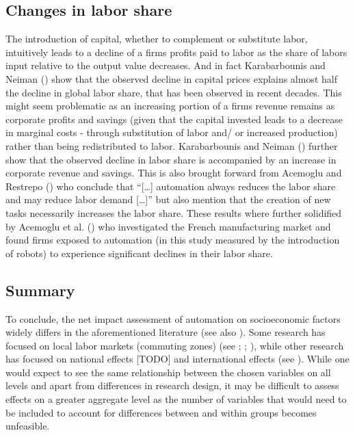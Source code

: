 \documentclass[
  12pt,
  a4paperpaper,
]{article}
\begin{document}
\subsection{Changes in labor share}\label{changes-in-labor-share}

The introduction of capital, whether to complement or substitute labor,
intuitively leads to a decline of a firms profits paid to labor as the
share of labors input relative to the output value decreases. And in
fact Karabarbounis and Neiman
() show that the
observed decline in capital prices explains almost half the decline in
global labor share, that has been observed in recent decades. This might
seem problematic as an increasing portion of a firms revenue remains as
corporate profits and savings (given that the capital invested leads to
a decrease in marginal costs - through substitution of labor and/ or
increased production) rather than being redistributed to labor.
Karabarbounis and Neiman () further show that the observed decline in labor share is
accompanied by an increase in corporate revenue and savings. This is
also brought forward from Acemoglu and Restrepo
() who conclude that
``{[}\ldots{]} automation always reduces the labor share and may reduce
labor demand {[}\ldots{]}'' but also mention that the creation of new
tasks necessarily increases the labor share. These results where further
solidified by Acemoglu et al.
() who investigated
the French manufacturing market and found firms exposed to automation
(in this study measured by the introduction of robots) to experience
significant declines in their labor share.

\subsection{Summary}\label{sec-summary-of-effects}

To conclude, the net impact assessment of automation on socioeconomic
factors widely differs in the aforementioned literature (see also
). Some
research has focused on local labor markets (commuting zones) (see
;
;
), while other
research has focused on national effects {[}TODO{]} and international
effects (see ). While one would expect to see the same relationship between the
chosen variables on all levels and apart from differences in research
design, it may be difficult to assess effects on a greater aggregate
level as the number of variables that would need to be included to
account for differences between and within groups becomes unfeasible.
\end{document}
